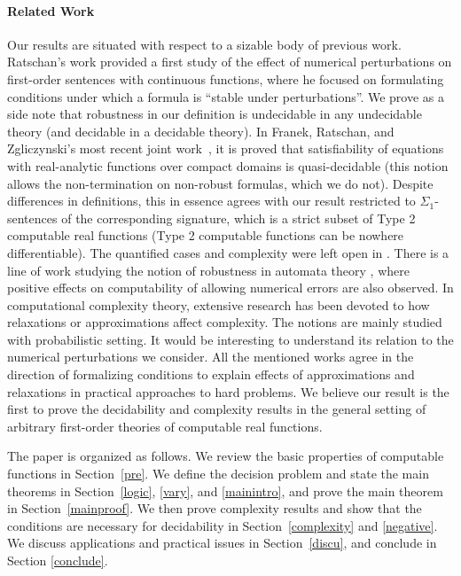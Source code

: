 \documentclass[prodmode]{acmsmall} %
\begin{document}
\paragraph*{Related Work} Our results are situated with respect to a sizable body of previous work. Ratschan's work \cite{DBLP:journals/jsc/Ratschan02} provided a first study of the effect of numerical perturbations on first-order sentences with continuous functions, where he focused on formulating conditions under which a formula is ``stable under perturbations''. We prove as a side note that robustness in our definition is undecidable in any undecidable theory (and decidable in a decidable theory). In Franek, Ratschan, and Zgliczynski's most recent joint work~\cite{DBLP:conf/mfcs/FranekRZ11}, it is proved that satisfiability of equations with real-analytic functions over compact domains is quasi-decidable (this notion allows the non-termination on non-robust formulas, which we do not). Despite differences in definitions, this in essence agrees with our result restricted to $\Sigma_1$-sentences of the corresponding signature, which is a strict subset of Type 2 computable real functions (Type 2 computable functions can be nowhere differentiable). The quantified cases and complexity were left open in \cite{DBLP:conf/mfcs/FranekRZ11}. There is a line of work studying the notion of robustness in automata theory \cite{DBLP:conf/icalp/AsarinC05,DBLP:conf/csl/Franzle99,DBLP:conf/lics/AsarinB01}, where positive effects on computability of allowing numerical errors are also observed. In computational complexity theory, extensive research has been devoted to how relaxations or approximations affect complexity. The notions are mainly studied with probabilistic setting. It would be interesting to understand its relation to the numerical perturbations we consider. All the mentioned works agree in the direction of formalizing conditions to explain effects of approximations and relaxations in practical approaches to hard problems. We believe our result is the first to prove the decidability and complexity results in the general setting of arbitrary first-order theories of computable real functions. 


The paper is organized as follows. We review the basic properties of computable functions in Section~\ref{pre}. We define the decision problem and state the main theorems in Section~\ref{logic}, \ref{vary}, and \ref{mainintro}, and prove the main theorem in Section~\ref{mainproof}. We then prove complexity results and show that the conditions are necessary for decidability in Section~\ref{complexity} and \ref{negative}. We discuss applications and practical issues in Section~\ref{discu}, and conclude in Section \ref{conclude}. 
\end{document}

